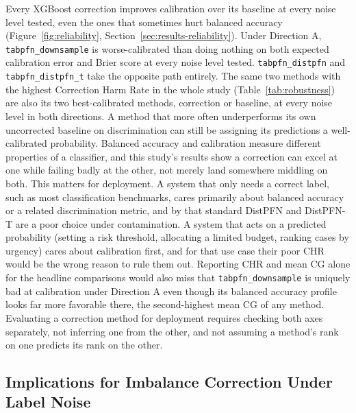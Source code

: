 Every XGBoost correction improves calibration over its baseline at every
noise level tested, even the ones that sometimes hurt balanced accuracy
(Figure~\ref{fig:reliability}, Section~\ref{sec:results-reliability}).
Under Direction A, \texttt{tabpfn\_downsample} is worse-calibrated than
doing nothing on both expected calibration error and Brier score at every
noise level tested. \texttt{tabpfn\_distpfn} and
\texttt{tabpfn\_distpfn\_t} take the opposite path entirely. The same two
methods with the highest Correction Harm Rate in the whole study
(Table~\ref{tab:robustness}) are also
its two best-calibrated methods, correction or baseline, at every
noise level in both directions. A method that more often underperforms
its own uncorrected baseline on discrimination can still be assigning its
predictions a well-calibrated probability. Balanced accuracy and
calibration measure different
properties of a classifier, and this study's results show a correction
can excel at one while failing badly at the other, not merely land
somewhere middling on both. This matters for deployment. A system that
only needs a correct label, such as most classification benchmarks,
cares primarily about balanced accuracy or a related discrimination
metric, and by that standard DistPFN and DistPFN-T are a poor choice
under contamination. A system that acts on a predicted probability
(setting a risk threshold, allocating a limited budget, ranking cases by
urgency) cares about calibration first, and for that use case their poor
CHR would be the wrong reason to rule them out. Reporting CHR and mean CG
alone for the headline comparisons would also miss that
\texttt{tabpfn\_downsample} is uniquely bad at calibration under
Direction A even though its balanced accuracy profile looks far more
favorable there, the second-highest mean CG of any method. Evaluating a
correction method for deployment requires checking both axes separately,
not inferring one from the other, and not assuming a method's rank on one
predicts its rank on the other.

\subsection{Implications for Imbalance Correction Under Label Noise}
\label{sec:discussion-implications}

